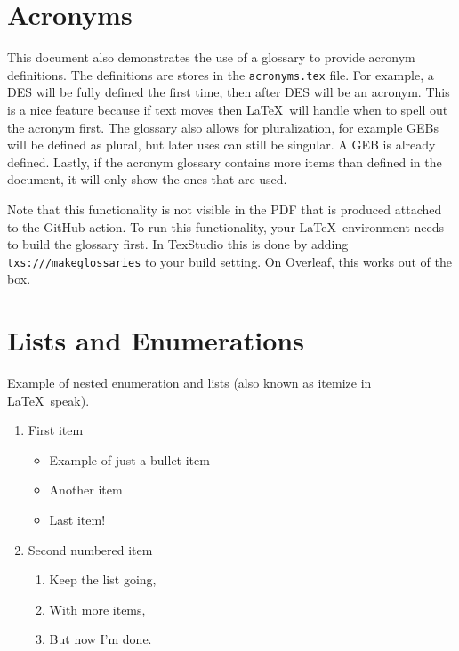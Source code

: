 \section{Acronyms}

This document also demonstrates the use of a glossary to provide acronym definitions. The definitions are stores in the \texttt{acronyms.tex} file. For example, a \gls{DES} will be fully defined the first time, then after \gls{DES} will be an acronym. This is a nice feature because if text moves then \LaTeX\ will handle when to spell out the acronym first. The glossary also allows for pluralization, for example \glspl{GEB} will be defined as plural, but later uses can still be singular. A \gls{GEB} is already defined. Lastly, if the acronym glossary contains more items than defined in the document, it will only show the ones that are used.

Note that this functionality is not visible in the PDF that is produced attached to the GitHub action. To run this functionality, your \LaTeX\ environment needs to build the glossary first. In TexStudio this is done by adding \texttt{txs:///makeglossaries} to your build setting. On Overleaf, this works out of the box.

\section{Lists and Enumerations}

Example of nested enumeration and lists (also known as itemize in \LaTeX\ speak).

\begin{enumerate}
  \item First item
        \begin{itemize}
          \item Example of just a bullet item
          \item Another item
          \item Last item!
        \end{itemize}

  \item Second numbered item
        \begin{enumerate}
          \item Keep the list going,
          \item With more items,
          \item But now I'm done.
        \end{enumerate}
\end{enumerate}


